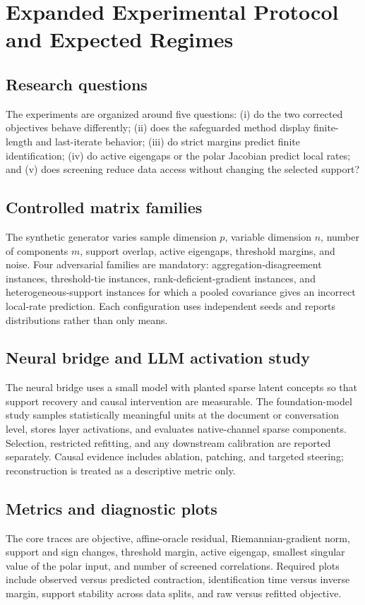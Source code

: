 \section{Expanded Experimental Protocol and Expected Regimes}
\label{sec:expanded-experiments}

\subsection{Research questions}
The experiments are organized around five questions: (i) do the two corrected objectives behave differently; (ii) does the safeguarded method display finite-length and last-iterate behavior; (iii) do strict margins predict finite identification; (iv) do active eigengaps or the polar Jacobian predict local rates; and (v) does screening reduce data access without changing the selected support?

\subsection{Controlled matrix families}
The synthetic generator varies sample dimension $p$, variable dimension $n$, number of components $m$, support overlap, active eigengaps, threshold margins, and noise. Four adversarial families are mandatory: aggregation-disagreement instances, threshold-tie instances, rank-deficient-gradient instances, and heterogeneous-support instances for which a pooled covariance gives an incorrect local-rate prediction. Each configuration uses independent seeds and reports distributions rather than only means.

\subsection{Neural bridge and LLM activation study}
The neural bridge uses a small model with planted sparse latent concepts so that support recovery and causal intervention are measurable. The foundation-model study samples statistically meaningful units at the document or conversation level, stores layer activations, and evaluates native-channel sparse components. Selection, restricted refitting, and any downstream calibration are reported separately. Causal evidence includes ablation, patching, and targeted steering; reconstruction is treated as a descriptive metric only.

\subsection{Metrics and diagnostic plots}
The core traces are objective, affine-oracle residual, Riemannian-gradient norm, support and sign changes, threshold margin, active eigengap, smallest singular value of the polar input, and number of screened correlations. Required plots include observed versus predicted contraction, identification time versus inverse margin, support stability across data splits, and raw versus refitted objective.

